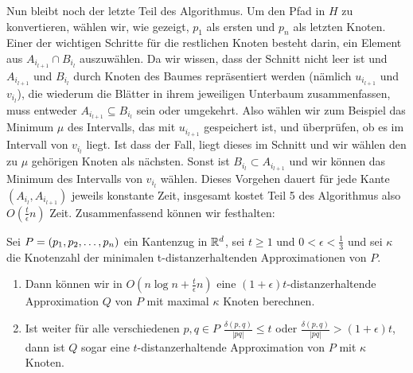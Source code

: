     Nun bleibt noch der letzte Teil des Algorithmus. 
    Um den Pfad in $H$ zu konvertieren, wählen wir, wie gezeigt, $p_1$ als ersten und $p_n$ als letzten Knoten. 
    Einer der wichtigen Schritte für die restlichen Knoten besteht darin, ein Element aus $A_{i_{l+1}} \cap B_{i_l}$ auszuwählen. 
    Da wir wissen, dass der Schnitt nicht leer ist und $A_{i_{l+1}}$ und $B_{i_l}$ durch Knoten des Baumes repräsentiert werden (nämlich $u_{i_{l+1}}$ und $v_{i_l}$), die wiederum die Blätter in ihrem jeweiligen Unterbaum zusammenfassen, muss entweder $A_{i_{l+1}}\subseteq B_{i_l}$ sein oder umgekehrt. 
    Also wählen wir zum Beispiel das Minimum $\mu$ des Intervalls, das mit $u_{i_{l+1}}$ gespeichert ist, und überprüfen, ob es im Intervall von $v_{i_l}$ liegt. 
    Ist dass der Fall, liegt dieses im Schnitt und wir wählen den zu $\mu$ gehörigen Knoten als nächsten. Sonst ist $B_{i_l}\subset A_{i_{l+1}}$ und wir können das Minimum des Intervalls von $v_{i_l}$ wählen. Dieses Vorgehen dauert für jede Kante $(A_{i_l}, A_{i_{l+1}})$ jeweils konstante Zeit, insgesamt kostet Teil 5 des Algorithmus also $O(\frac{t}{\epsilon}n)$ Zeit.
    Zusammenfassend können wir festhalten:
    
    \begin{theorem}
    	\label{theo:mvpstime}
    	Sei $P = (p_1, p_2, \mathellipsis, p_n)$ ein Kantenzug in $\mathbb{R}^d$, sei $t \geq 1$ und $0 < \epsilon < \frac{1}{3}$ und sei $\kappa$ die Knotenzahl der minimalen t-distanzerhaltenden Approximationen von $P$.
    	\begin{enumerate}
    		\item Dann können wir in $O(n \log n + \frac{t}{\epsilon}n)$ eine $(1 + \epsilon)t$-distanzerhaltende Approximation $Q$ von $P$ mit maximal $\kappa$ Knoten berechnen.
    		\item Ist weiter für alle verschiedenen $p, q \in P$ $\frac{\delta(p,q)}{|pq|} \leq t$ oder $\frac{\delta(p,q)}{|pq|} > (1 + \epsilon)t$, dann ist $Q$ sogar eine $t$-distanzerhaltende Approximation von $P$ mit $\kappa$ Knoten.
    	\end{enumerate}
    	
    \end{theorem}